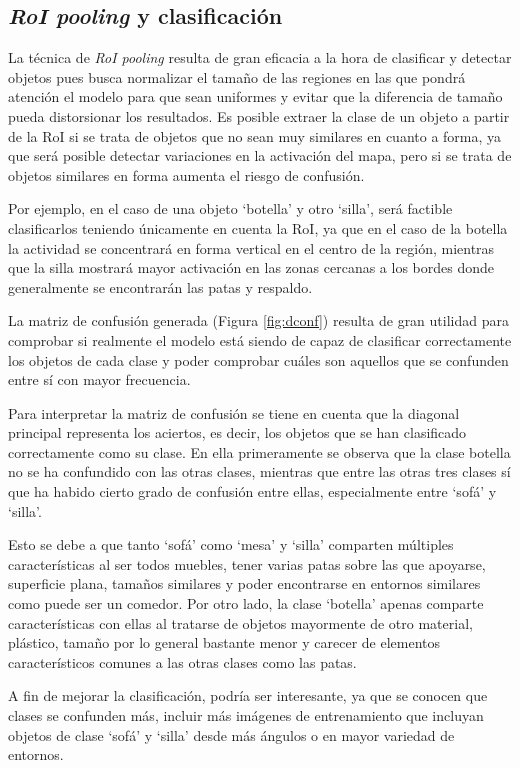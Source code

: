 \subsection {\textit{RoI pooling} y clasificación}
    La técnica de \textit{RoI pooling} resulta de gran eficacia a la hora de clasificar y detectar objetos pues busca normalizar el tamaño de las regiones en las que pondrá atención el modelo para que sean uniformes y evitar que la diferencia de tamaño pueda distorsionar los resultados. Es posible extraer la clase de un objeto a partir de la RoI si se trata de objetos que no sean muy similares en cuanto a forma, ya que será posible detectar variaciones en la activación del mapa, pero si se trata de objetos similares en forma aumenta el riesgo de confusión.

    Por ejemplo, en el caso de una objeto `botella' y otro `silla', será factible clasificarlos teniendo únicamente en cuenta la RoI, ya que en el caso de la botella la actividad se concentrará en forma vertical en el centro de la región, mientras que la silla mostrará mayor activación en las zonas cercanas a los bordes donde generalmente se encontrarán las patas y respaldo.

    La matriz de confusión generada (Figura \ref{fig:dconf}) resulta de gran utilidad para comprobar si realmente el modelo está siendo de capaz de clasificar correctamente los objetos de cada clase y poder comprobar cuáles son aquellos que se confunden entre sí con mayor frecuencia.


    Para interpretar la matriz de confusión se tiene en cuenta que la diagonal principal representa los aciertos, es decir, los objetos que se han clasificado correctamente como su clase. En ella primeramente se observa que la clase botella no se ha confundido con las otras clases, mientras que entre las otras tres clases sí que ha habido cierto grado de confusión entre ellas, especialmente entre `sofá' y `silla'.

    Esto se debe a que tanto `sofá' como `mesa' y `silla' comparten múltiples características al ser todos muebles, tener varias patas sobre las que apoyarse, superficie plana, tamaños similares y poder encontrarse en entornos similares como puede ser un comedor. Por otro lado, la clase `botella' apenas comparte características con ellas al tratarse de objetos mayormente de otro material, plástico, tamaño por lo general bastante menor y carecer de elementos característicos comunes a las otras clases como las patas.

    A fin de mejorar la clasificación, podría ser interesante, ya que se conocen que clases se confunden más, incluir más imágenes de entrenamiento que incluyan objetos de clase `sofá' y `silla' desde más ángulos o en mayor variedad de entornos.



